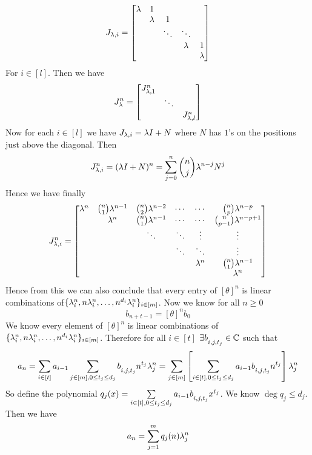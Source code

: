 \documentclass[a4paper, 11pt]{article}
\begin{document}
{\begin{itemize}[label=$\bullet$]
$$J_{\lambda,i}=\left[\begin{matrix}\lambda & 1   &        & & \\
				 	 & \lambda & 1      & &\\
			 	     &     & \ddots & \ddots &\\
		 	        &      &        &        \lambda& 1\\
	 	          &       &        &         & \lambda\end{matrix}\right]$$For $i\in[l]$. Then we have $$J_{\lambda}^n=\left[\begin{matrix}J_{\lambda,1}^n & & \\ & \ddots & \\ & & J_{\lambda,l}^n\end{matrix}\right]$$Now for each $i\in[l]$ we have $J_{\lambda,i}=\lambda I+N$ where $N$ has $1$'s on the positions just above the diagonal. Then $$J^n_{\lambda,i}=(\lambda I+N)^n=\sum\limits_{j=0}^n \binom{n}{j}\lambda^{n-j}N^j$$Hence we have finally 
$$J^n_{\lambda,i}=\left[\begin{matrix}  \lambda^n & \binom{n}{1}\lambda^{n-1} & \binom{n}{2}\lambda^{n-2} & \cdots & \cdots & \binom{n}{p}\lambda^{n-p}\\
                           & \lambda^n & \binom{n}{1}\lambda^{n-1} & \cdots & \cdots & \binom{n}{p-1}\lambda^{n-p+1}\\
                           &                       & \ddots                & \ddots & \vdots & \vdots\\
                           &                       &                       & \ddots & \ddots & \vdots \\
                           &                       &                       &        &  \lambda^n & \binom{n}{1}\lambda^{n-1}\\
                           &                       &                       &        &        & \lambda^n\end{matrix}\right] $$Hence from this we can also conclude that every entry of $[\theta]^n$ is linear combinations of\linebreak $\{\lambda_i^n,n\lambda_i^n,\dots, n^{d_i}\lambda_i^n\}_{i\in[m]}$.                     Now we know for all $n\geq 0$ $$b_{n+t-1}=[\theta]^n b_0$$We know every element of $[\theta]^n$ is linear combinations of $\{\lambda_i^n,n\lambda_i^n,\dots, n^{d_i}\lambda_i^n\}_{i\in[m]}$. Therefore for all $i\in[t]$ $\exists b\strut_{i,j,t_j}\in\mathbb{C}$ such that $$a_n=\sum_{i\in[t]} a_{i-1}\sum\limits_{j\in[m],0\leq t_j\leq d_j}b\strut_{i,j,t_j}n^{t_j}\lambda_j^n=\sum_{j\in[m]} \left[\sum\limits_{i\in[t],0\leq t_j\leq d_j}a_{i-1}b\strut_{i,j,t_j}n^{t_j}\right]\lambda_j^n$$So define the polynomial $q_j(x)=\sum\limits_{i\in[t],0\leq t_j\leq d_j}a_{i-1}b\strut_{i,j,t_j}x^{t_j}$. We know $\deg q_j\leq d_j$. Then we have $$a_n= \sum_{j=1}^m q_j(n)\lambda_j^n$$\parinn
                       

\end{itemize}}
\end{document}
